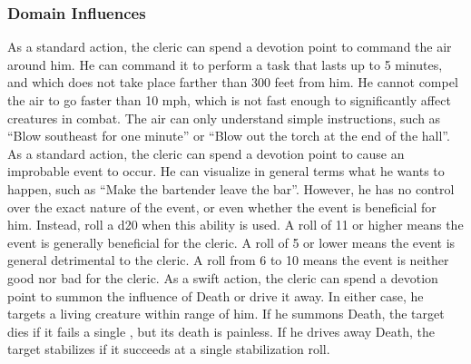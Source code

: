 \subsubsection{Domain Influences}\label{Domain Influences}
As a standard action, the cleric can spend a devotion point to command the air around him.
He can command it to perform a task that lasts up to 5 minutes, and which does not take place farther than 300 feet from him.
He cannot compel the air to go faster than 10 mph, which is not fast enough to significantly affect creatures in combat.
The air can only understand simple instructions, such as ``Blow southeast for one minute'' or ``Blow out the torch at the end of the hall''.
As a standard action, the cleric can spend a devotion point to cause an improbable event to occur.
He can visualize in general terms what he wants to happen, such as ``Make the bartender leave the bar''.
However, he has no control over the exact nature of the event, or even whether the event is beneficial for him.
Instead, roll a d20 when this ability is used.
A roll of 11 or higher means the event is generally beneficial for the cleric.
A roll of 5 or lower means the event is general detrimental to the cleric.
A roll from 6 to 10 means the event is neither good nor bad for the cleric.
As a swift action, the cleric can spend a devotion point to summon the influence of Death or drive it away.
In either case, he targets a living creature within \rngmed range of him.
If he summons Death, the target dies if it fails a single , but its death is painless.
If he drives away Death, the target stabilizes if it succeeds at a single stabilization roll.

